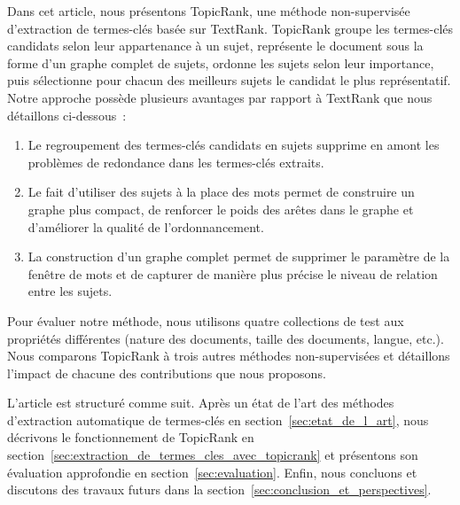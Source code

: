   Dans cet article, nous présentons TopicRank, une méthode non-supervisée d'extraction de termes-clés basée sur TextRank.
  TopicRank groupe les termes-clés candidats selon leur appartenance à un sujet, représente le document sous la forme d'un graphe complet de sujets, ordonne les sujets selon leur importance, puis sélectionne pour chacun des meilleurs sujets le candidat le plus représentatif.
  Notre approche possède plusieurs avantages par rapport à TextRank que nous détaillons ci-dessous~:
  \begin{enumerate}
    \item Le regroupement des termes-clés candidats en sujets supprime en amont les problèmes de redondance dans les termes-clés extraits.
    \item Le fait d'utiliser des sujets à la place des mots permet de construire un graphe plus compact, de renforcer le poids des arêtes dans le graphe et d'améliorer la qualité de l'ordonnancement.
    \item La construction d'un graphe complet permet de supprimer le paramètre de la fenêtre de mots et de capturer de manière plus précise le niveau de relation entre les sujets.
  \end{enumerate}

  Pour évaluer notre méthode, nous utilisons quatre collections de test aux propriétés différentes (nature des documents, taille des documents, langue, etc.).
  Nous comparons TopicRank à trois autres méthodes non-supervisées et détaillons l'impact de chacune des contributions que nous proposons.

  L'article est structuré comme suit.
  Après un état de l'art des méthodes d'extraction automatique de termes-clés en section~\ref{sec:etat_de_l_art}, nous décrivons le fonctionnement de TopicRank en section~\ref{sec:extraction_de_termes_cles_avec_topicrank} et présentons son évaluation approfondie en section~\ref{sec:evaluation}.
  Enfin, nous concluons et discutons des travaux futurs dans la section~\ref{sec:conclusion_et_perspectives}.
